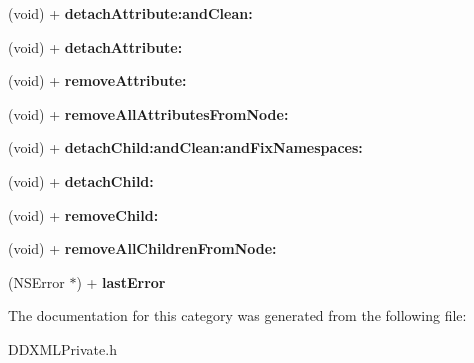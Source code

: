 \begin{DoxyCompactItemize}
\item 
\hypertarget{category_d_d_x_m_l_node_07_private_a_p_i_08_a6d34e285eac33bd3a066bfee44a8aa54}{}(void) + {\bfseries detach\+Attribute\+:and\+Clean\+:}\label{category_d_d_x_m_l_node_07_private_a_p_i_08_a6d34e285eac33bd3a066bfee44a8aa54}

\item 
\hypertarget{category_d_d_x_m_l_node_07_private_a_p_i_08_abf1cc298afa5651c1bdbb4fd338749b9}{}(void) + {\bfseries detach\+Attribute\+:}\label{category_d_d_x_m_l_node_07_private_a_p_i_08_abf1cc298afa5651c1bdbb4fd338749b9}

\item 
\hypertarget{category_d_d_x_m_l_node_07_private_a_p_i_08_aa5c29baa6fd7833f95e0c7dff43e1ae1}{}(void) + {\bfseries remove\+Attribute\+:}\label{category_d_d_x_m_l_node_07_private_a_p_i_08_aa5c29baa6fd7833f95e0c7dff43e1ae1}

\item 
\hypertarget{category_d_d_x_m_l_node_07_private_a_p_i_08_ae406e96cdbee29e07324a0ad0f9b4bd7}{}(void) + {\bfseries remove\+All\+Attributes\+From\+Node\+:}\label{category_d_d_x_m_l_node_07_private_a_p_i_08_ae406e96cdbee29e07324a0ad0f9b4bd7}

\item 
\hypertarget{category_d_d_x_m_l_node_07_private_a_p_i_08_aacd8e9f03afa2d1cc259608455ba9112}{}(void) + {\bfseries detach\+Child\+:and\+Clean\+:and\+Fix\+Namespaces\+:}\label{category_d_d_x_m_l_node_07_private_a_p_i_08_aacd8e9f03afa2d1cc259608455ba9112}

\item 
\hypertarget{category_d_d_x_m_l_node_07_private_a_p_i_08_a0255e4cc8ce17320b050a8f516d34db1}{}(void) + {\bfseries detach\+Child\+:}\label{category_d_d_x_m_l_node_07_private_a_p_i_08_a0255e4cc8ce17320b050a8f516d34db1}

\item 
\hypertarget{category_d_d_x_m_l_node_07_private_a_p_i_08_aae2f10f3e92f6ea26b0367c373dd736f}{}(void) + {\bfseries remove\+Child\+:}\label{category_d_d_x_m_l_node_07_private_a_p_i_08_aae2f10f3e92f6ea26b0367c373dd736f}

\item 
\hypertarget{category_d_d_x_m_l_node_07_private_a_p_i_08_a9182478556efda5804577ecd9ddb52f8}{}(void) + {\bfseries remove\+All\+Children\+From\+Node\+:}\label{category_d_d_x_m_l_node_07_private_a_p_i_08_a9182478556efda5804577ecd9ddb52f8}

\item 
\hypertarget{category_d_d_x_m_l_node_07_private_a_p_i_08_a3335b796982ebb9aa55d5e3621d46a9b}{}(N\+S\+Error $\ast$) + {\bfseries last\+Error}\label{category_d_d_x_m_l_node_07_private_a_p_i_08_a3335b796982ebb9aa55d5e3621d46a9b}

\end{DoxyCompactItemize}


The documentation for this category was generated from the following file\+:\begin{DoxyCompactItemize}
\item 
D\+D\+X\+M\+L\+Private.\+h\end{DoxyCompactItemize}
